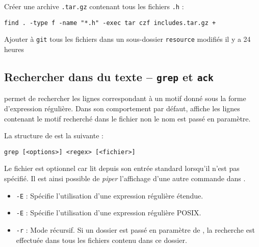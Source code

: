 Créer une archive \texttt{.tar.gz} contenant tous les fichiers \texttt{.h} :
\begin{nscenter}
\texttt{find . -type f -name "*.h" -exec tar czf includes.tar.gz {} +}
\end{nscenter}

Ajouter à \texttt{git} tous les fichiers dans un sous-dossier \texttt{resource} modifiés il y a 24 heures

\newpage
\subsection{Rechercher dans du texte -- \texttt{grep} et \texttt{ack}} 
 permet de rechercher les lignes correspondant à un motif donné sous la forme d'expression régulière. Dans son comportement par défaut,  affiche les lignes contenant le motif recherché dans le fichier non le nom est passé en paramètre.

La structure de  est la suivante : 
\begin{nscenter}
\texttt{grep [<options>] <regex> [<fichier>]}
\end{nscenter}
Le fichier est optionnel car  lit depuis son entrée standard lorsqu'il n'est pas spécifié. Il est ainsi possible de \textit{piper} l'affichage d'une autre commande dans .

\begin{itemize}
    \item \texttt{-E} : Spécifie l'utilisation d'une expression régulière étendue.
    \item \texttt{-E} : Spécifie l'utilisation d'une expression régulière POSIX.
    \item \texttt{-r} : Mode récursif. Si un dossier est passé en paramètre de , la recherche est effectuée dans tous les fichiers contenu dans ce dossier.
\end{itemize}

